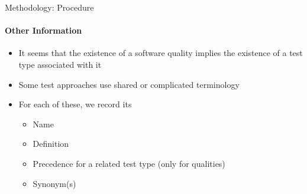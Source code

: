 \documentclass{beamer}
\begin{document}
\begin{frame}{Methodology: Procedure}
    \framesubtitle{Other Information}
    \begin{itemize}
        \item It seems that the existence of a software quality implies the
              existence of a test type associated with it \pause
        \item Some test approaches use shared or complicated terminology \pause
        \item For each of these, we record its
              \begin{itemize}
                  \item Name
                  \item Definition
                  \item Precedence for a related test type (only for qualities)
                  \item Synonym(s)
              \end{itemize}
    \end{itemize}
\end{frame}


%   



\end{document}
